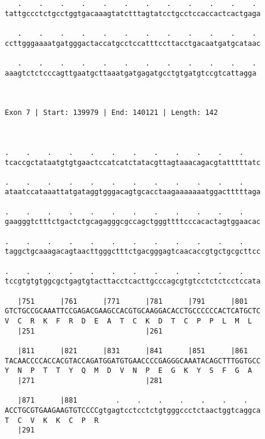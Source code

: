 \documentclass{article}
\begin{document}
\begin{Verbatim}
   .    .    .    .    .    .    .    .    .    .    .    . 
tattgccctctgcctggtgacaaagtatctttagtatcctgcctccaccactcactgaga
                                                            
   .    .    .    .    .    .    .    .    .    .    .    . 
ccttgggaaaatgatgggactaccatgcctccatttccttacctgacaatgatgcataac
                                                            
   .    .    .    .    .    .    .    .    .    .    .    .
aaagtctctcccagttgaatgcttaaatgatgagatgcctgtgatgtccgtcattagga
                                                           
                                                           
 
Exon 7 | Start: 139979 | End: 140121 | Length: 142



.    .    .    .    .    .    .    .    .    .    .    .    
tcaccgctataatgtgtgaactccatcatctatacgttagtaaacagacgtatttttatc
                                                            
.    .    .    .    .    .    .    .    .    .    .    .    
ataatccataaattatgataggtgggacagtgcacctaagaaaaaaatggactttttaga
                                                            
.    .    .    .    .    .    .    .    .    .    .    .    
gaagggtctttctgactctgcagagggcgccagctgggttttcccacactagtggaacac
                                                            
.    .    .    .    .    .    .    .    .    .    .    .    
taggctgcaaagacagtaacttgggctttctgacgggagtcaacaccgtgctgcgcttcc
                                                            
.    .    .    .    .    .    .    .    .    .    .    .    
tccgtgtgtggcgctgagtgtacttacctcacttgcccagcgtgtcctctctcctccata
                                                            
   |751      |761      |771      |781      |791      |801   
GTCTGCCGCAAATTCCGAGACGAAGCCACGTGCAAGGACACCTGCCCCCCACTCATGCTC
V  C  R  K  F  R  D  E  A  T  C  K  D  T  C  P  P  L  M  L  
   |251                          |261                       
  
   |811      |821      |831      |841      |851      |861   
TACAACCCCACCACGTACCAGATGGATGTGAACCCCGAGGGCAAATACAGCTTTGGTGCC
Y  N  P  T  T  Y  Q  M  D  V  N  P  E  G  K  Y  S  F  G  A  
   |271                          |281                       
  
   |871      |881         .    .    .    .    .    .    .   
ACCTGCGTGAAGAAGTGTCCCCgtgagtcctcctctgtgggccctctaactggtcaggca
T  C  V  K  K  C  P  R                                      
   |291                                                     
  

\end{Verbatim}
\end{document}
